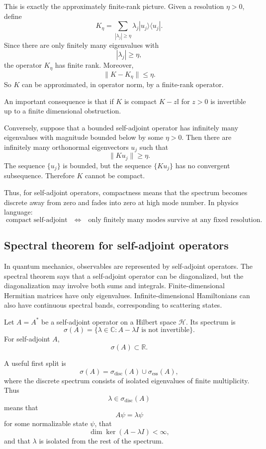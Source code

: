 \documentclass[JHEP,12pt]{article}
\begin{document}
This is exactly the approximately finite-rank picture. Given a resolution
\(\eta>0\), define
\[
K_\eta
=
\sum_{|\lambda_j|\ge \eta}
\lambda_j |u_j\rangle\langle u_j| .
\]
Since there are only finitely many eigenvalues with
\[
|\lambda_j|\ge \eta ,
\]
the operator \(K_\eta\) has finite rank. Moreover,
\[
\|K-K_\eta\|\le \eta .
\]
So \(K\) can be approximated, in operator norm, by a finite-rank operator.

An important consequence is that if $K$ is compact $K-z \mathbb{I}$ for $z>0$ is invertible up to a finite dimensional obstruction.

Conversely, suppose that a bounded self-adjoint operator has infinitely many
eigenvalues with magnitude bounded below by some \(\eta>0\). Then there are
infinitely many orthonormal eigenvectors \(u_j\) such that
\[
\|Ku_j\|\ge \eta .
\]
The sequence \(\{u_j\}\) is bounded, but the sequence \(\{Ku_j\}\) has no
convergent subsequence. Therefore \(K\) cannot be compact.

Thus, for self-adjoint operators, compactness means that the spectrum becomes
discrete away from zero and fades into zero at high mode number. In physics
language:
\[
\text{compact self-adjoint}
\quad\Longleftrightarrow\quad
\text{only finitely many modes survive at any fixed resolution.}
\]



\subsection{Spectral theorem for self-adjoint operators}

In quantum mechanics, observables are represented by self-adjoint operators.
The spectral theorem says that a self-adjoint operator can be diagonalized, but
the diagonalization may involve both sums and integrals. Finite-dimensional
Hermitian matrices have only eigenvalues. Infinite-dimensional Hamiltonians can
also have continuous spectral bands, corresponding to scattering states.

Let \(A=A^\ast\) be a self-adjoint operator on a Hilbert space \(\mathcal H\).
Its spectrum is
\[
\sigma(A)=\{\lambda\in\mathbb C: A-\lambda I \text{ is not invertible}\}.
\]
For self-adjoint \(A\),
\[
\sigma(A)\subset \mathbb R .
\]

A useful first split is
\[
\sigma(A)=\sigma_{\mathrm{disc}}(A)\cup\sigma_{\mathrm{ess}}(A),
\]
where the discrete spectrum consists of isolated eigenvalues of finite
multiplicity. Thus
\[
\lambda\in\sigma_{\mathrm{disc}}(A)
\]
means that
\[
A\psi=\lambda\psi
\]
for some normalizable state \(\psi\), that
\[
\dim\ker(A-\lambda I)<\infty,
\]
and that \(\lambda\) is isolated from the rest of the spectrum.
\end{document}
